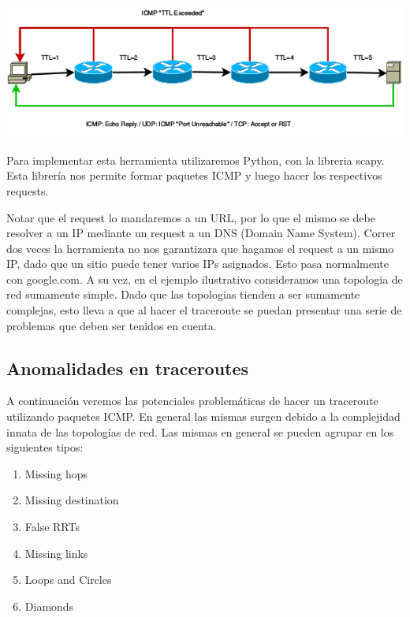 \includegraphics[width=\textwidth,keepaspectratio]{images/traceroute_typical}

Para implementar esta herramienta utilizaremos Python, con la libreria scapy. Esta librería nos permite formar paquetes ICMP y luego hacer los respectivos requests.

Notar que el request lo mandaremos a un URL, por lo que el mismo se debe resolver a un IP mediante un request a un DNS (Domain Name System). Correr dos veces la herramienta no nos garantizara que hagamos el request a un mismo IP, dado que un sitio puede tener varios IPs asignados. Esto pasa normalmente con google.com. A su vez, en el ejemplo ilustrativo consideramos una topologia de red sumamente simple. Dado que las topologias tienden a ser sumamente complejas, esto lleva a que al hacer el traceroute se puedan presentar una serie de problemas que deben ser tenidos en cuenta.

\subsection{Anomalidades en traceroutes}

A continuación veremos las potenciales problemáticas de hacer un traceroute utilizando paquetes ICMP. En general las mismas surgen debido a la complejidad innata de las topologías de red. Las mismas en general se pueden agrupar en los siguientes tipos:

\begin{enumerate}
	\item Missing hops
	\item Missing destination
	\item False RRTs
	\item Missing links
	\item Loops and Circles
	\item Diamonds
\end{enumerate}
